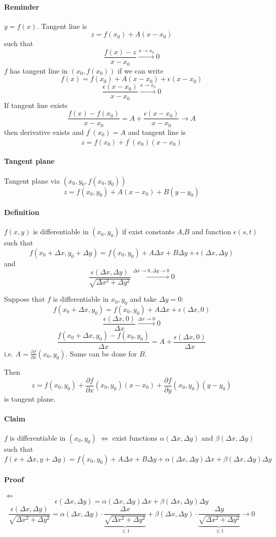 \paragraph{Reminder}
$y=f(x)$.
Tangent line is
$$z = f(x_0) + A(x-x_0)$$
such that
$$\frac{f(x)-z}{x-x_0} \stackrel{x \to x_0}{\to} 0$$
$f$ has tangent line in $(x_0, f(x_0))$ if we can write 
$$f(x) = f(x_0) +A(x-x_0) + \epsilon(x-x_0)$$
$$\frac{\epsilon(x-x_0)}{x-x_0} \stackrel{x \to x_0}{\to} 0$$
If tangent line exists
$$\frac{f(x) - f(x_0)}{x-x_0} = A  + \frac{\epsilon(x-x_0)}{x-x_0} \to A$$
then derivative exists and $f^\prime(x_0) = A$ and tangent line is
$$z = f(x_0) + f^\prime(x_0)(x-x_0)$$
\paragraph{Tangent plane}
Tangent plane via $(x_0, y_0, f(x_0, y_0))$
$$z = f(x_0, y_0)+A(x-x_0)+B(y-y_0)$$
\paragraph{Definition}
$f(x,y)$ is differentiable in $(x_0,y_0)$ if exist constants $A$,$B$ and function $\epsilon(s,t)$ such that
$$f(x_0+\Delta x,y_0+\Delta y) = f(x_0,y_0)+A\Delta x + B\Delta y + \epsilon(\Delta x, \Delta y)$$
and
$$\frac{\epsilon(\Delta x, \Delta y)}{\sqrt{\Delta x^2+\Delta y^2}} \stackrel{\Delta x \to 0, \Delta y \to 0}{\to} 0$$

Suppose that $f$ is differentiable in $x_0, y_0$ and take $\Delta y = 0$:
$$f(x_0+\Delta x,y_0) = f(x_0,y_0)+A\Delta x + \epsilon(\Delta x,0)$$
$$\frac{\epsilon(\Delta x, 0)}{\Delta x} \stackrel{\Delta x \to 0}{\to} 0$$
$$\frac{f(x_0+\Delta x, y_0) - f(x_0,y_0)}{\Delta x} = A + \frac{\epsilon(\Delta x, 0)}{\Delta x}$$
i.e. $A = \frac{\partial f}{\partial x}(x_0, y_0)$. Same can be done for $B$.

Then
$$z = f(x_0,y_0) + \frac{\partial f}{\partial x}(x_0, y_0)(x-x_0)+ \frac{\partial f}{\partial y}(x_0, y_0)(y-y_0)$$
is tangent plane.
\paragraph{Claim}
$f$ is differentiable in $(x_0,y_0)$ $\iff$ exist functions $\alpha(\Delta x, \Delta y)$ and $\beta(\Delta x, \Delta y)$ such that
$$f(x+\Delta x, y+\Delta y) = f(x_0, y_0)+A\Delta x + B\Delta y + \alpha(\Delta x, \Delta y)\Delta x + \beta(\Delta x, \Delta y)\Delta y$$
\paragraph{Proof}
$\Leftarrow$
$$\epsilon\left( \Delta x, \Delta y \right) =  \alpha(\Delta x, \Delta y)\Delta x + \beta(\Delta x, \Delta y)\Delta y$$
$$\frac{\epsilon\left( \Delta x, \Delta y \right) }{\sqrt{\Delta x^2+ \Delta y^2}} = \alpha\left( \Delta x, \Delta y \right)  \cdot \underbrace{\frac{\Delta x}{\sqrt{\Delta x^2+ \Delta y^2}}}_{\leq 1} +  \beta\left( \Delta x, \Delta y \right)  \cdot \underbrace{\frac{\Delta y}{\sqrt{\Delta x^2+ \Delta y^2}}}_{\leq 1} \to 0$$
